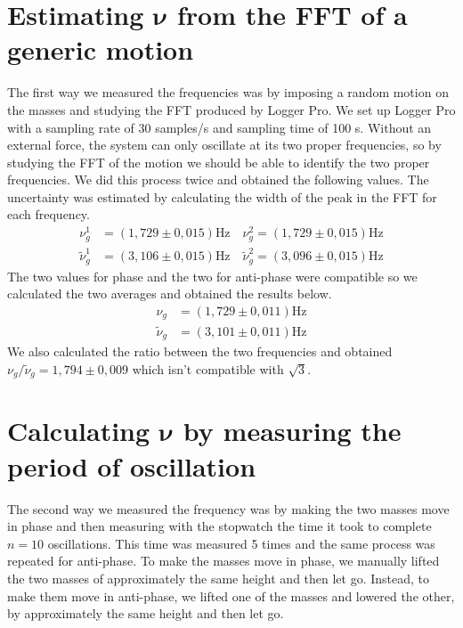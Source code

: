 \documentclass{article}
\begin{document}
\section{Estimating $\bm \nu$ from the FFT of a generic motion}
The first way we measured the frequencies was by imposing a random motion on the masses and studying the FFT produced by Logger Pro. We set up Logger Pro with a sampling rate of 30 samples/s and sampling time of 100 s. Without an external force, the system can only oscillate at its two proper frequencies, so by studying the FFT of the motion we should be able to identify the two proper frequencies. We did this process twice and obtained the following values. The uncertainty was estimated by calculating the width of the peak in the FFT for each frequency.
\begin{align}
           \nu_g^1 &= (1,729 \pm 0,015) \text{Hz} \quad        \nu_g^2 = (1,729 \pm 0,015) \text{Hz} \\
    \tilde \nu_g^1 &= (3,106 \pm 0,015) \text{Hz} \quad \tilde \nu_g^2 = (3,096 \pm 0,015) \text{Hz}
\end{align}
The two values for phase and the two for anti-phase were compatible so we calculated the two averages and obtained the results below.
\begin{align}
           \nu_g &= (1,729 \pm 0,011) \text{Hz}\\
    \tilde \nu_g &= (3,101 \pm 0,011) \text{Hz}
\end{align}
We also calculated the ratio between the two frequencies and obtained $ \nu_g / \tilde \nu_g = 1,794 \pm 0,009$ which isn't compatible with $\sqrt 3$.

\section{Calculating $\bm \nu$ by measuring the period of oscillation}

The second way we measured the frequency was by making the two masses move in phase and then measuring with the stopwatch the time it took to complete $n=10$ oscillations. This time was measured 5 times and the same process was repeated for anti-phase. To make the masses move in phase, we manually lifted the two masses of approximately the same height and then let go. Instead, to make them move in anti-phase, we lifted one of the masses and lowered the other, by approximately the same height and then let go.
\end{document}
